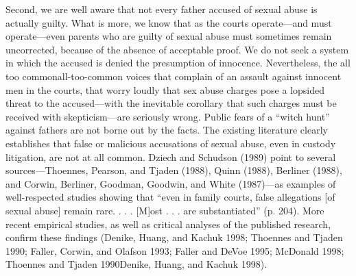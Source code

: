 Second, we are well aware that not every father accused of sexual abuse is actually guilty. What is more, we know that as the courts operate—and must operate—even parents who are guilty of sexual abuse must sometimes remain uncorrected, because of the absence of acceptable proof. We do not seek a system in which the accused is denied the presumption of innocence. Nevertheless, the all too commonall-too-common voices that complain of an assault against innocent men in the courts, that worry loudly that sex abuse charges pose a lopsided threat to the accused—with the inevitable corollary that such charges must be received with skepticism—are seriously wrong. Public fears of a “witch hunt” against fathers are not borne out by the facts. The existing literature clearly establishes that false or malicious accusations of sexual abuse, even in custody litigation, are not at all common. Dziech and Schudson (1989) point to several sources—Thoennes, Pearson, and Tjaden (1988), Quinn (1988), Berliner (1988), and Corwin, Berliner, Goodman, Goodwin, and White (1987)—as examples of well-respected studies showing that “even in family courts, false allegations [of sexual abuse] remain rare. . . . [M]ost . . . are substantiated” (p. 204). More recent empirical studies, as well as critical analyses of the published research, confirm these findings (Denike, Huang, and Kachuk 1998; Thoennes and Tjaden 1990; Faller, Corwin, and Olafson 1993; Faller and DeVoe 1995; McDonald 1998; Thoennes and Tjaden 1990Denike, Huang, and Kachuk 1998). \pfl{}


